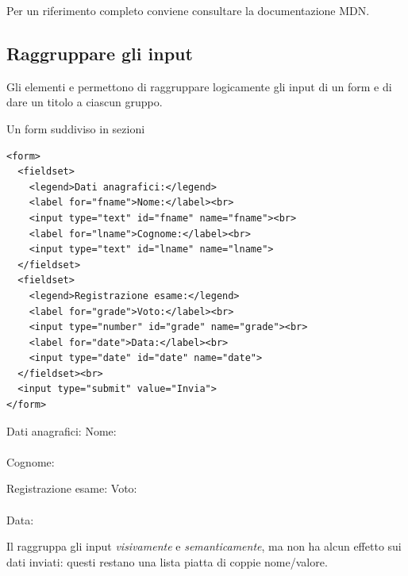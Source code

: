 Per un riferimento completo conviene consultare la documentazione MDN.

\subsection{Raggruppare gli input}

Gli elementi  e  permettono di raggruppare logicamente
gli input di un form e di dare un titolo a ciascun gruppo.

\begin{esempio}{Un form suddiviso in sezioni}
\begin{affianco}[0.55]
\begin{lstlisting}[style=html, name=fieldset.html]
<form>
  <fieldset>
    <legend>Dati anagrafici:</legend>
    <label for="fname">Nome:</label><br>
    <input type="text" id="fname" name="fname"><br>
    <label for="lname">Cognome:</label><br>
    <input type="text" id="lname" name="lname">
  </fieldset>
  <fieldset>
    <legend>Registrazione esame:</legend>
    <label for="grade">Voto:</label><br>
    <input type="number" id="grade" name="grade"><br>
    <label for="date">Data:</label><br>
    <input type="date" id="date" name="date">
  </fieldset><br>
  <input type="submit" value="Invia">
</form>
\end{lstlisting}
\risultato
\begin{browser}
  \begin{wtfieldset}{Dati anagrafici:}
    Nome:\\ \\
    Cognome:\\ 
  \end{wtfieldset}
  \begin{wtfieldset}{Registrazione esame:}
    Voto:\\ \\
    Data:\\ 
  \end{wtfieldset}
  \vspace{4pt}
\end{browser}
\end{affianco}

Il  raggruppa gli input \textit{visivamente} e
\textit{semanticamente}, ma non ha alcun effetto sui dati inviati: questi
restano una lista piatta di coppie nome/valore.
\end{esempio}

